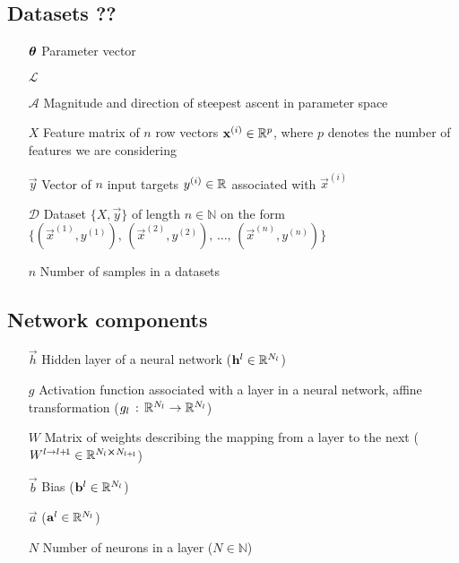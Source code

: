\noindent\subsection{Datasets ??}
\begin{itemize}
    \item[$\svec{\theta}$] Parameter vector
    \item[$\mathcal{L}$] 
    \item[$\mathcal{A}$] Magnitude and direction of steepest ascent in parameter space
    \item[$X$] Feature matrix of $n$ row vectors $\vec{x}^{(i)} \in \RR[p]$, where $p$ denotes the number of features we are considering
    \item[$\vec{y}$] Vector of $n$ input targets $y^{(i)} \in \RR$ associated with $\vec{x}^{(i)}$
    \item[$\mathcal{D}$] Dataset $\big\{ X, \vec{y} \big\}$ of length $n\in \mathbb{N}$ on the form $\big\{(\vec{x}^{(1)}, y^{(1)}),\,(\vec{x}^{(2)}, y^{(2)}),\,\dots, \, (\vec{x}^{(n)}, y^{(n)}) \big\} $
    \item[$n$] Number of samples in a datasets  
\end{itemize}
\subsection{Network components}
\begin{itemize}
    \item[$\vec{h}$] Hidden layer of a neural network ($\vec{h}^l \in \RR[N_l]$)
    \item[$g$] Activation function associated with a layer in a neural network, affine transformation ($g_l \,:\,\RR[N_l] \to\RR[N_{l}]$)
    \item[$W$] Matrix of weights describing the mapping from a layer to the next ($W^{l\to l+\! 1} \in \RR[N_l \cross N_{l+\! 1}]$)
    \item[$\vec{b}$] Bias ($\vec{b}^l \in \RR[N_l]$) 
    \item[$\vec{a}$]  ($\vec{a}^l \in \RR[N_l]$)
    \item[$N$] Number of neurons in a layer ($N \in \mathbb{N}$)
\end{itemize}


